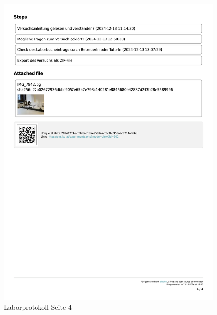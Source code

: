 \documentclass[a4paper,12pt]{article}
\begin{document}
\begin{figure}[H]
    \centering
    \includegraphics[width=1\textwidth]{bilder/Protokoll_Bilder/Protokoll4.png}
    \caption{Laborprotokoll Seite 4}
    \label{fig:Protokoll4}
\end{figure}
\end{document}
